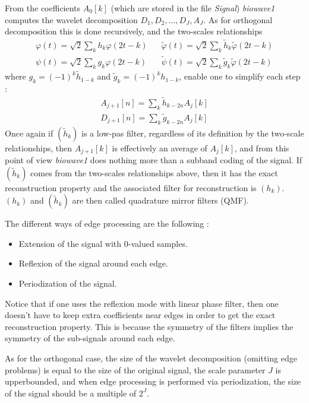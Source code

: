 From the coefficients $A_{0}[k]$ (which are stored in the file {\em Signal}) {\em biowave1} computes the wavelet decomposition $D_{1}, D_{2}, \ldots, D_{J}, A_{J}$. As for orthogonal decomposition this is done recursively, and the two-scales relationships 
\[
\begin{array}{ll}
\varphi(t) = \sqrt{2} \sum_{k} h_{k} \varphi(2t-k)  \;\;\; &
\tilde{\varphi}(t) = \sqrt{2} \sum_{k} \tilde{h}_{k} \tilde{\varphi}(2t-k) \\
\psi(t) = \sqrt{2} \sum_{k} g_{k} \varphi(2t-k) &
\tilde{\psi}(t) = \sqrt{2} \sum_{k} \tilde{g}_{k} \tilde{\varphi}(2t-k)
\end{array}
\]
where \( g_{k} = (-1)^{k} \tilde{h}_{1-k} \) and \( \tilde{g}_{k} = (-1)^{k} h_{1-k} \), enable one to simplify each step :
\begin{eqnarray*}
A_{j+1}[n] = \sum_{k} \tilde{h}_{k-2n} A_{j}[k] \\
D_{j+1}[n] = \sum_{k} \tilde{g}_{k-2n} A_{j}[k] 
\end{eqnarray*}
Once again if \( (\tilde{h}_{k}) \) is a low-pas filter, regardless of its definition by the two-scale relationships, then \( A_{j+1}[k] \) is effectively an average of \( A_{j}[k] \), and from this point of view {\em biowave1} does nothing more than a subband coding of the signal. If \( (\tilde{h}_{k}) \) comes from the two-scales relationships above, then it has the exact reconstruction property and the associated filter for reconstruction is $(h_{k})$. $(h_{k})$ and $(\tilde{h}_{k})$ are then called quadrature mirror filters (QMF). 

The different ways of edge processing are the following :
\begin{itemize}
\item
Extension of the signal with \( 0 \)-valued samples.
\item
Reflexion of the signal around each edge.
\item
Periodization of the signal.
\end{itemize}
Notice that if one uses the reflexion mode with linear phase filter, then one doesn't have to keep extra coefficients near edges in order to get the exact reconstruction property. 
This is because the symmetry of the filters implies the symmetry of the sub-signals around each edge.

As for the orthogonal case, the size of the wavelet decomposition (omitting edge problems) is equal to the size of the original signal, the scale parameter \( J \) is upperbounded, and when edge processing is performed via periodization, the size of the signal should be a multiple of $2^J$. 

